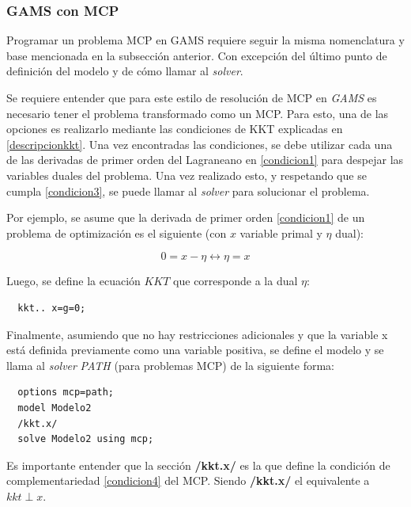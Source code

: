 \subsubsection{GAMS con MCP}

Programar un problema MCP en GAMS requiere seguir la misma nomenclatura y base mencionada en la subsección anterior. Con excepción del último punto de definición del modelo y de cómo llamar al \textit{solver}. 
\vspace{2.5mm}

Se requiere entender que para este estilo de resolución de MCP en \textit{GAMS} es necesario tener el problema transformado como un MCP. Para esto, una de las opciones es realizarlo mediante las condiciones de KKT explicadas en \ref{descripcionkkt}. Una vez encontradas las condiciones, se debe utilizar cada una de las derivadas de primer orden del Lagraneano en \ref{condicion1} para despejar las variables duales del problema. Una vez realizado esto, y respetando que se cumpla \ref{condicion3}, se puede llamar al \textit{solver} para solucionar el problema. 
\vspace{2.5mm}

Por ejemplo, se asume que la derivada de primer orden \ref{condicion1} de un problema de optimización es el siguiente (con $x$ variable primal y $\eta$ dual):

$$0=x-\eta \leftrightarrow \eta=x$$

Luego, se define la ecuación $KKT$ que corresponde a la dual $\eta$:

\begin{footnotesize}
\begin{lstlisting}
  kkt.. x=g=0;
 \end{lstlisting}
\end{footnotesize}


Finalmente, asumiendo que no hay restricciones adicionales y que la variable x está definida previamente como una variable positiva, se define el modelo y se llama al \textit{solver} \textit{PATH} (para problemas MCP) de la siguiente forma:

\begin{footnotesize}
\begin{lstlisting}
  options mcp=path;
  model Modelo2
  /kkt.x/
  solve Modelo2 using mcp;
\end{lstlisting}
\end{footnotesize}


Es importante entender que la sección \textbf{/kkt.x/} es la que define la condición de complementariedad \ref{condicion4} del MCP. Siendo \textbf{/kkt.x/} el equivalente a  $kkt \perp x$. 

